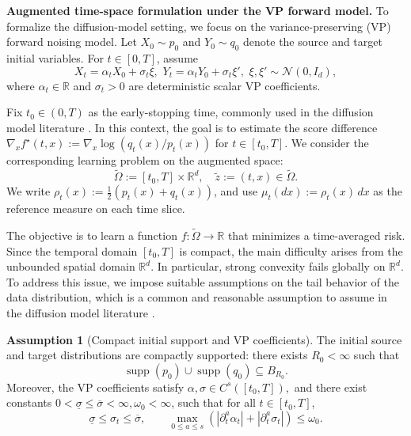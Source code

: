 \documentclass[11pt]{article}
\DeclareMathOperator{\supp}{supp}
\theoremstyle{plain}
\theoremstyle{definition}
\newtheorem{assumption}[theorem]{Assumption}
\theoremstyle{remark}
\begin{document}
{\bf Augmented time-space formulation under the VP forward model.}
To formalize the diffusion-model setting, we focus on the variance-preserving
(VP) forward noising model. Let \(X_0\sim p_0\) and \(Y_0\sim q_0\) denote
the source and target initial variables. For \(t\in[0,T]\), assume
\[
X_t=\alpha_t X_0+\sigma_t \xi,\,\, Y_t=\alpha_t Y_0+\sigma_t \xi', \,\,\xi,\xi'\sim\mathcal N(0,I_d),
\]
where \(\alpha_t\in\mathbb R\) and \(\sigma_t>0\) are deterministic scalar
VP coefficients.

Fix $t_0\in(0,T)$ as the early-stopping time, commonly used in the diffusion model literature \cite{han2024neural}. In this context, the goal is to estimate the score difference $\nabla_x f^\star(t, x):=\nabla_x \log (q_t(x)/p_t(x))$ for $t \in [t_0, T]$. We consider the corresponding learning problem on the augmented space:
\begin{equation*}
\tilde{\Omega}:= [t_0, T] \times \mathbb{R}^d, \quad \tilde{z}:= (t, x) \in \tilde{\Omega}.
\end{equation*}
We write \(\rho_t(x):=\frac12(p_t(x)+q_t(x))\), and use \(\mu_t(dx):=\rho_t(x)\,dx\) as the reference measure on each time slice.


The objective is to learn a function $f: \tilde{\Omega} \to \mathbb{R}$ that minimizes a time-averaged risk. Since the temporal domain $[t_0, T]$ is compact, the main difficulty arises from the unbounded spatial domain $\mathbb{R}^d$. In particular, strong convexity fails globally on $\mathbb{R}^d$. To address this issue, we impose suitable assumptions on the tail behavior of the data distribution, which is a common and reasonable assumption to assume in the diffusion model literature \cite{han2024neural,li2023generalization,kong2024diffusion}.


\begin{assumption}[Compact initial support and VP coefficients]
\label{assm:unbounded_diffusion}
The initial source and target distributions are compactly supported: there
exists \({R_0}<\infty\) such that
\[
\supp(p_0)\cup\supp(q_0)\subseteq B_{{R_0}}.
\]
Moreover, the VP coefficients satisfy
$
\alpha,\sigma\in C^s([t_0,T]),
$
and there exist constants
$
0<\underline\sigma\le \overline\sigma<\infty, {\omega_0}<\infty$, such that for all \(t\in[t_0,T]\),
\[
\underline\sigma\le \sigma_t\le \overline\sigma,
\qquad
\max_{0\le a\le s}
\left(
|\partial_t^a\alpha_t|
+
|\partial_t^a\sigma_t|
\right)
\le {\omega_0}.
\]
\end{assumption}
\end{document}
